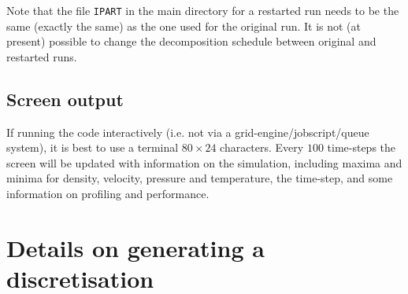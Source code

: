 \documentclass[notitlepage]{revtex4-1}
\begin{document}
Note that the file \verb|IPART| in the main directory for a restarted run needs to be the same (exactly the same) as the one used for the original run. It is not (at present) possible to change the decomposition schedule between original and restarted runs.

\subsection{Screen output}

If running the code interactively (i.e. not via a grid-engine/jobscript/queue system), it is best to use a terminal $80\times{24}$ characters. Every $100$ time-steps the screen will be updated with information on the simulation, including maxima and minima for density, velocity, pressure and temperature, the time-step, and some information on profiling and performance.

\appendix

\section{Details on generating a discretisation}\label{ap:datclass}
\end{document}
